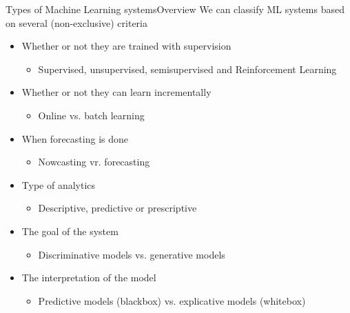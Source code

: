\documentclass[10pt,compress]{beamer} %
\begin{document}
\begin{frame}{Types of Machine Learning systems}{Overview}
    We can classify ML systems based on several (non-exclusive) criteria
	\begin{itemize}
		\item Whether or not they are trained with supervision
			\begin{itemize}
			\item Supervised, unsupervised, semisupervised and Reinforcement Learning
			\end{itemize}
		\item Whether or not they can learn incrementally
			\begin{itemize}
			\item Online vs. batch learning
			\end{itemize}
		\item When forecasting is done
			\begin{itemize}
			\item Nowcasting vr. forecasting
			\end{itemize}
		\item Type of analytics
			\begin{itemize}
			\item Descriptive, predictive or prescriptive
			\end{itemize}
		\item The goal of the system
			\begin{itemize}
			\item Discriminative models vs. generative models
			\end{itemize}
		\item The interpretation of the model
			\begin{itemize}
			\item Predictive models (blackbox) vs. explicative models (whitebox)
			\end{itemize}
	\end{itemize}
\end{frame}
\end{document}
